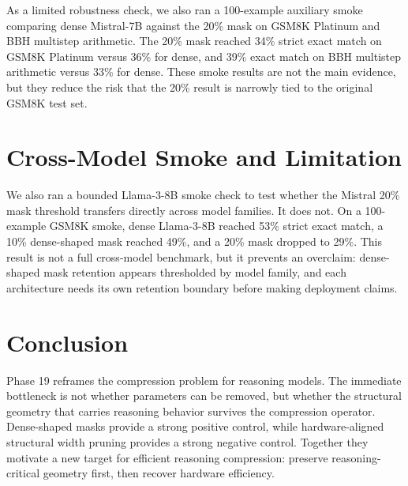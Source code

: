 \documentclass{article}
\begin{document}
As a limited robustness check, we also ran a 100-example auxiliary smoke comparing dense Mistral-7B against the 20\% mask on GSM8K Platinum and BBH multistep arithmetic. The 20\% mask reached 34\% strict exact match on GSM8K Platinum versus 36\% for dense, and 39\% exact match on BBH multistep arithmetic versus 33\% for dense. These smoke results are not the main evidence, but they reduce the risk that the 20\% result is narrowly tied to the original GSM8K test set.

\section{Cross-Model Smoke and Limitation}

We also ran a bounded Llama-3-8B smoke check to test whether the Mistral 20\% mask threshold transfers directly across model families. It does not. On a 100-example GSM8K smoke, dense Llama-3-8B reached 53\% strict exact match, a 10\% dense-shaped mask reached 49\%, and a 20\% mask dropped to 29\%. This result is not a full cross-model benchmark, but it prevents an overclaim: dense-shaped mask retention appears thresholded by model family, and each architecture needs its own retention boundary before making deployment claims.

\section{Conclusion}

Phase 19 reframes the compression problem for reasoning models. The immediate bottleneck is not whether parameters can be removed, but whether the structural geometry that carries reasoning behavior survives the compression operator. Dense-shaped masks provide a strong positive control, while hardware-aligned structural width pruning provides a strong negative control. Together they motivate a new target for efficient reasoning compression: preserve reasoning-critical geometry first, then recover hardware efficiency.



\end{document}
